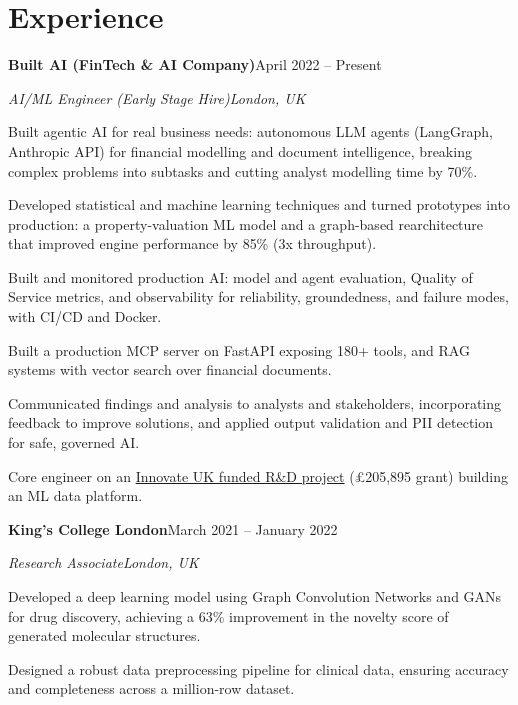 \documentclass[10pt,a4paper]{article}
\newcommand{\entry}[4]{%
  {\color{company}\bfseries #1}\hfill {\color{muted}#2}\par
  \vspace{1pt}
  {\itshape #3}\hfill {\color{muted}\itshape #4}\par
  \vspace{3pt}%
}
\begin{document}
\section{Experience}
\entry{Built AI (FinTech \& AI Company)}{April 2022 -- Present}{AI/ML Engineer (Early Stage Hire)}{London, UK}
\begin{tight}
  \item Built agentic AI for real business needs: autonomous LLM agents (LangGraph, Anthropic API) for financial modelling and document intelligence, breaking complex problems into subtasks and cutting analyst modelling time by 70\%.
  \item Developed statistical and machine learning techniques and turned prototypes into production: a property-valuation ML model and a graph-based rearchitecture that improved engine performance by 85\% (3x throughput).
  \item Built and monitored production AI: model and agent evaluation, Quality of Service metrics, and observability for reliability, groundedness, and failure modes, with CI/CD and Docker.
  \item Built a production MCP server on FastAPI exposing 180+ tools, and RAG systems with vector search over financial documents.
  \item Communicated findings and analysis to analysts and stakeholders, incorporating feedback to improve solutions, and applied output validation and PII detection for safe, governed AI.
  \item Core engineer on an \href{https://gtr.ukri.org/projects?ref=10022996}{Innovate UK funded R\&D project} (\pounds205,895 grant) building an ML data platform.
\end{tight}

\entry{King's College London}{March 2021 -- January 2022}{Research Associate}{London, UK}
\begin{tight}
  \item Developed a deep learning model using Graph Convolution Networks and GANs for drug discovery, achieving a 63\% improvement in the novelty score of generated molecular structures.
  \item Designed a robust data preprocessing pipeline for clinical data, ensuring accuracy and completeness across a million-row dataset.
\end{tight}

\end{document}
